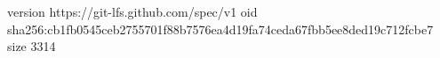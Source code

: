 version https://git-lfs.github.com/spec/v1
oid sha256:cb1fb0545ceb2755701f88b7576ea4d19fa74ceda67fbb5ee8ded19c712fcbe7
size 3314
